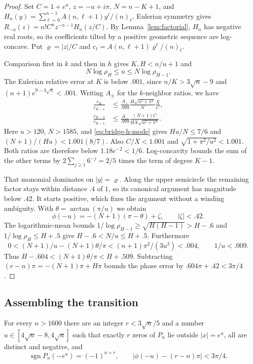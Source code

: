 \begin{proof}
Set $C=1+e^u$, $z=-u+i\pi$, $N=n-K+1$, and
$H_n(y)=\sum_{\ell=0}^{n-1}A(n,\ell+1)y^\ell/(n)_\ell$.
Eulerian symmetry gives $R_{-u}(z)=n!C^nz^{-n-1}H_n(z/C)$.
By Lemma~\ref{lem:factorial}, $H_n$ has negative real roots, so its
coefficients tilted by a positive geometric sequence are log-concave.
Put $\varrho=|z|/C$ and
$c_\ell=A(n,\ell+1)\varrho^\ell/(n)_\ell$.

Comparison first in $k$ and then in $h$ gives $K,H<n/u+1$ and
\begin{equation}\label{eq:bridge-h-mode}
 N\log\rho_H\le u\le N\log\rho_{H-1}.
\end{equation}
The Eulerian relative error at $K$ is below $.001$, since
$n/K>3\sqrt n-9$ and $(n+1)e^{9-3\sqrt n}<.001$.
Writing $A_\pm$ for the $k$-neighbor ratios, we have
\begin{align*}
 \frac{c_K}{c_{K-1}}
 &\le\frac{A_+}{.999}\frac{H\sqrt{u^2+\pi^2}}N\frac XC,\\
 \frac{c_{K-2}}{c_{K-1}}
 &\le\frac{A_-}{.999}\frac{(N+1)C}{HX\sqrt{u^2+\pi^2}}.
\end{align*}
Here $u>120$, $N>1585$, and \eqref{eq:bridge-h-mode} gives
$Hu/N\le7/6$ and $(N+1)/(Hu)<1.001(8/7)$.
Also $C/X<1.001$ and $\sqrt{1+\pi^2/u^2}<1.001$.
Both ratios are therefore below $1.18e^{-2}<1/6$.
Log-concavity bounds the sum of the other terms by
$2\sum_{j\ge1}6^{-j}=2/5$ times the term of degree $K-1$.

That monomial dominates on $|y|=\varrho$. Along the upper semicircle
the remaining factor stays within distance $.4$ of $1$, so its
canonical argument has magnitude below $.42$. It starts positive,
which fixes the argument without a winding ambiguity. With
$\theta=\arctan(\pi/u)$ we obtain
\[
 \phi(-u)=-(N+1)(\pi-\theta)+\zeta,\qquad |\zeta|<.42.
\]
The logarithmic-mean bounds
$1/\log\rho_{H-1}\ge\sqrt{H(H-1)}>H-.6$ and
$1/\log\rho_H\le H+.5$ give $H-.6<N/u\le H+.5$.
Furthermore
\[
 0<(N+1)/u-(N+1)\theta/\pi
 <(n+1)\pi^2/(3u^3)<.004,\qquad 1/u<.009.
\]
Thus $H-.604<(N+1)\theta/\pi<H+.509$.
Subtracting $(r-n)\pi=-(N+1)\pi+H\pi$ bounds the phase error by
$.604\pi+.42<3\pi/4$.
\end{proof}

\subsection{Assembling the transition}

\begin{lemma}\label{lem:bridge}
For every $n>1600$ there are an integer $r<3\sqrt n/5$ and a number
$u\in[4\sqrt n-8,4\sqrt n]$ such that exactly $r$ zeros of $P_n$ lie
outside $|x|=e^u$, all are distinct and negative, and
\[
 \operatorname{sgn}P_n(-e^u)=(-1)^{n+r},\qquad
 |\phi(-u)-(r-n)\pi|<3\pi/4.
\]
\end{lemma}

